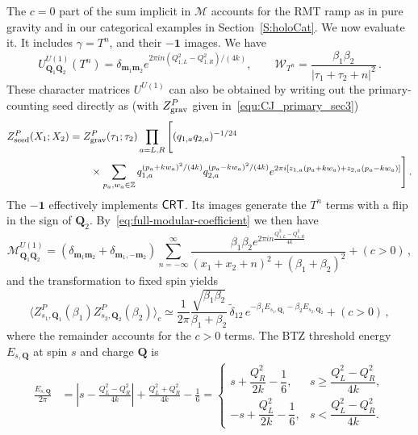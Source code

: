 \documentclass[11pt]{article}
\numberwithin{equation}{section}
\begin{document}
The $c=0$ part of the sum implicit in $\mathcal{M}$ accounts for the RMT ramp as in pure gravity and in our categorical examples in Section~\ref{S:holoCat}.  We now evaluate it. It includes $\gamma=T^n$, and their $-\mathbf1$ images. We have
\begin{equation}
U^{U(1)}_{\mathbf Q_1\mathbf Q_2}(T^n)
 =\delta_{\mathbf m_1\mathbf m_2}
 e^{2\pi i n(Q_{1,L}^2-Q_{1,R}^2)/(4k)},\qquad
 \mathcal W_{T^n}=\frac{\beta_1\beta_2}
 {|\tau_1+\tau_2+n|^2}\,.
\end{equation}
These character matrices $U^{U(1)}$ can also be obtained by writing out the primary-counting seed directly as (with $Z^P_{\rm grav}$ given in~\eqref{equ:CJ_primary_sec3})
\begin{equation}
\begin{aligned}
 Z_{\rm seed}^P(X_1;X_2)
 &=Z^P_{\rm grav}(\tau_1;\tau_2)\prod_{a=L,R}\Bigg[
 (q_{1,a}q_{2,a})^{-1/24}\\[-2pt]
 &\qquad\times\sum_{p_a,w_a\in\mathbb Z}
 q_{1,a}^{(p_a+kw_a)^2/(4k)}q_{2,a}^{(p_a-kw_a)^2/(4k)}
 e^{2\pi i[z_{1,a}(p_a+kw_a)+z_{2,a}(p_a-kw_a)]}\Bigg]\,.
\end{aligned}
\label{prim_seed}
\end{equation}
The $-\mathbf{1}$ effectively implements $\mathsf{CRT}$. Its images generate the $T^n$ terms with a flip in the sign of $\textbf{Q}_2$. By~\eqref{eq:full-modular-coefficient} we then have
\begin{equation}
    \mathcal{M}^{U(1)}_{\textbf{Q}_1\textbf{Q}_2} = \left( \delta_{\textbf{m}_1\textbf{m}_2}+ \delta_{\textbf{m}_1,-\textbf{m}_2}\right)\sum_{n=-\infty}^{\infty} \frac{\beta_1\beta_2 e^{2\pi i n\frac{Q_{1,L}^2-Q_{1,R}^2}{4k}}}{(x_1+x_2+n)^2+(\beta_1+\beta_2)^2} + (c>0)\,,
\end{equation}
and the transformation to fixed spin yields
\begin{equation}
 \langle Z^P_{s_1,\mathbf Q_1}(\beta_1)Z^P_{s_2,\mathbf Q_2}(\beta_2)\rangle_c
 \simeq \frac{1}{2\pi}\frac{\sqrt{\beta_1\beta_2}}{\beta_1+\beta_2}\,
 \widetilde{\delta}_{12}\,
 e^{-\beta_1 E_{s_1,\mathbf Q_1}-\beta_2E_{s_2,\mathbf{Q}_2}} + (c>0)\,,
\label{ramp_U(1)_bulk}
\end{equation}
where the remainder accounts for the $c>0$ terms. The BTZ threshold energy $E_{s,\textbf{Q}}$ at spin $s$ and charge $\textbf{Q}$ is 
\begin{equation}
\begin{aligned}
 \frac{E_{s,\mathbf Q}}{2\pi}
 &=\left|s-\frac{Q_L^2-Q_R^2}{4k}\right|
   +\frac{Q_L^2+Q_R^2}{4k}-\frac16=\begin{cases}
 s+\dfrac{Q_R^2}{2k}-\dfrac16,
   &s\geq\dfrac{Q_L^2-Q_R^2}{4k},\\[4pt]
 -s+\dfrac{Q_L^2}{2k}-\dfrac16,
   &s<\dfrac{Q_L^2-Q_R^2}{4k}.
 \end{cases}
\end{aligned}
\label{eq:U1-paired-threshold}
\end{equation}
\end{document}
